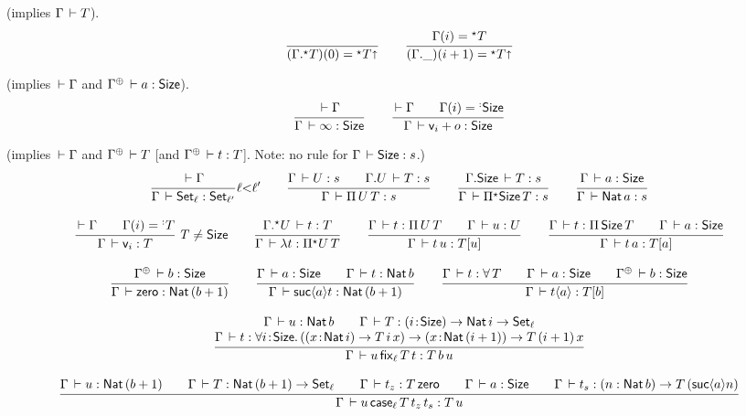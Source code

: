 \documentclass[acmlarge,review,anonymous]{acmart}\settopmatter{printfolios=true}
\begin{document}
 (implies $\Gamma \,\vdash T$).
\[
  \ru{}{(\eext \Gamma T)(0) = \eann T \slift}
\qquad
  \ru{\Gamma(i) = \eann T
    }{(\cext \Gamma \_)(i+1) = \eann T \slift}
\]

  (implies $\,\vdash \Gamma$ and $\resurrect \Gamma \der a : \Size$).
\[
  \ru{\der \Gamma}{\Gamma \der \infty : \Size}
\qquad
  \ru{\der \Gamma \qquad \Gamma(i) = \erann[\noterased]\Size
    }{\Gamma \der \ind i + o : \Size
    }
\]

  (implies $\,\vdash \Gamma$ and $\resurrect \Gamma \der T$ [and $\resurrect \Gamma \der t : T$]. Note: no rule for $\Gamma \,\vdash \mathsf{Size} : s$.)
\begin{gather*}
  \ru{\der \Gamma
    }{\Gamma \der \Set[\ell] : \Set[\ell']
    }{\ell {<} \ell'}
\qquad
  \ru{\Gamma \der U : s \qquad
      \cext \Gamma U \der T : s
    }{\Gamma \der \piT U T : s}
\qquad
  \ru{\cext \Gamma \Size \der T : s
    }{\Gamma \der \epiT \Size T : s}
\qquad
  \ru{%
      \Gamma \der a : \Size
    }{\Gamma \der \Nat a : s}
\\[2ex]
  \rux{\der \Gamma \qquad \Gamma(i) = \erann[\noterased] T
    }{\Gamma \der \ind i : T
    }{T \not= \Size}
\qquad
  \ru{\eext \Gamma U \der t : T
    }{\Gamma \der \lambda t : \epiT U T}
\qquad
  \ru{\Gamma \der t : \piT U T \qquad
      \Gamma \der u : U
    }{\Gamma \der t\,u : T[u]}
\qquad
  \ru{\Gamma \der t : \piT \Size T \qquad
      \Gamma \der a : \Size
    }{\Gamma \der t\,a : T[a]}
\\[2ex] %
  \ru{\resurrect\Gamma \der b : \Size
    }{\Gamma \der \tzero : \Nat (b + 1)}
\qquad
  \ru{\Gamma \der a : \Size \qquad
      \Gamma \der t : \Nat b
    }{\Gamma \der \suc a t : \Nat (b + 1)}
\qquad
  \ru{\Gamma \der t : \forallT T \qquad
      \Gamma \der a : \Size \qquad
      \resurrect\Gamma \der b : \Size
    }{\Gamma \der t \ann a : T[b]}
\\[2ex]
  \ru{\Gamma \der u : \Nat b \qquad
      \Gamma \der T : \funT i \Size \Nat i \to \Set[\ell] \\
      \Gamma \der t : \allT i \Size (\funT x {\Nat i} T\, i\, x) \to \funT x {\Nat (i + 1)} T \,(i+1)\, x
     }{\Gamma \der u\,\fix[\ell] T t : T \,b \, u}
\\[2ex]
  \ru{\Gamma \der u : \Nat (b + 1) \qquad
      \Gamma \der T : \Nat (b + 1) \to \Set[\ell] \qquad
      \Gamma \der t_z : T \, \tzero \qquad
      \Gamma \der a : \Size \qquad
      \Gamma \der t_s : (n : \Nat b) \to T \, (\suc a n)
    }{\Gamma \der u\,\case[\ell] T {t_z} t_s : T \, u}
\end{gather*}
\end{document}
